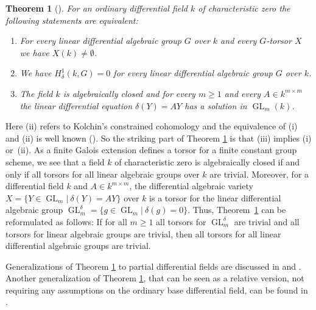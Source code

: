 \documentclass[oneside,reqno]{amsart}
\newtheorem{theo}{Theorem}[section]
\theoremstyle{definition}
\newcommand{\Gl}{\operatorname{GL}}
\newcommand{\de}{\delta}
\begin{document}
\begin{theo}[\cite{Pillay:ThePicardVessiotTheoryConstrainedCohomology}]  \label{theo: Pillay}
	For an ordinary differential field $k$ of characteristic zero the following statements are equivalent:
	\begin{enumerate}
		\item For every linear differential algebraic group $G$ over $k$ and every $G$-torsor $X$ we have $X(k)\neq\emptyset$.
		\item We have $H^1_\delta(k,G)=0$ for every linear differential algebraic group $G$ over $k$.
		\item The field $k$ is algebraically closed and for every $m\geq 1$ and every $A\in k^{m\times m}$ the linear differential equation $\de(Y)=AY$ has a solution in $\Gl_m(k)$.
	\end{enumerate}	
\end{theo}
Here (ii) refers to Kolchin's constrained cohomology and the equivalence of (i) and (ii) is well known (\cite[Chapter VII]{Kolchin:differentialalgebraicgroups}). So the striking part of Theorem \ref{theo: Pillay} is that (iii) implies (i) or~(ii). As a finite Galois extension defines a torsor for a finite constant group scheme, we see that a field $k$ of characteristic zero is algebraically closed if and only if all torsors for all linear algebraic groups over $k$ are trivial. Moreover, for a differential field $k$ and $A\in k^{m\times m}$, the differential algebraic variety $X=\{Y\in\Gl_m|\ \de(Y)=AY\}$ over $k$ is a torsor for the linear differential algebraic group $\Gl_m^\delta=\{g\in\Gl_m|\ \de(g)=0\}$.  Thus, Theorem~\ref{theo: Pillay} can be reformulated as follows: If for all $m\geq 1$ all torsors for $\Gl_m^\delta$ are trivial and all torsors for linear algebraic groups are trivial, then all torsors for all linear differential algebraic groups are trivial.


Generalizations of Theorem \ref{theo: Pillay} to partial differential fields are discussed in \cite{ChatzidakisPillay:GeneralizedPVExtensionsAndDifferentialGaloisCohomology} and \cite{MinchenkoOvchinnikov:TrivialityOfDifferentialGaloisCohomologyOfLinearDifferentialAlgebraicGroups}. Another generalization of Theorem \ref{theo: Pillay}, that can be seen as a relative version, not requiring any assumptions on the ordinary base differential field, can be found in \cite{MeretzkyPillay:PicardVessiotExtensionsLinearDifferentialAlgebraicGroupsAndTheirTorsors}.
\end{document}

